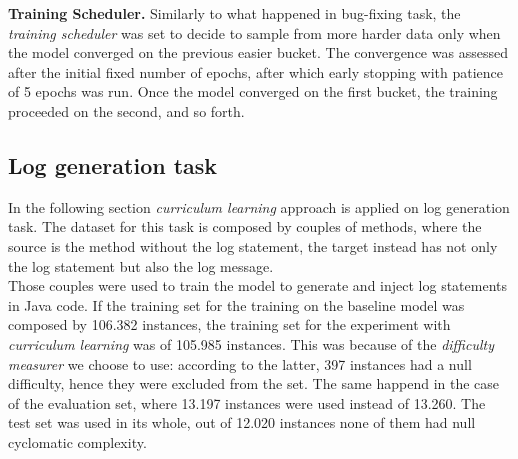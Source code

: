 \noindent\textbf{Training Scheduler.} Similarly to what happened in bug-fixing task, the \textit{training scheduler} was set to decide to sample from more harder data only when the model converged on the 
previous easier bucket. The convergence was assessed after the initial fixed number of epochs, after which early stopping with patience of 5 epochs
was run. Once the model converged on the first bucket, the training proceeded on the second, and so forth. 

\subsection{Log generation task}
In the following section \textit{curriculum learning} approach 
is applied on log generation task.
The dataset for this task is composed by couples of methods, where the source is the method without the log statement,
the target instead has not only the log statement but also the log message.\\
Those couples were used to train the model to generate and inject log statements in Java code.
If the training set for the training on the baseline model was composed by 106.382 instances, the training set for the experiment with \textit{curriculum learning} 
was of 105.985 instances. This was because of the \textit{difficulty measurer} we choose to use: according to the latter, 397 instances had a null difficulty, hence
they were excluded from the set. The same happend in the case of the evaluation set, 
where 13.197 instances were used instead of 13.260. The test set was used in its whole, out of 12.020 instances
none of them had null cyclomatic complexity.
\newline


